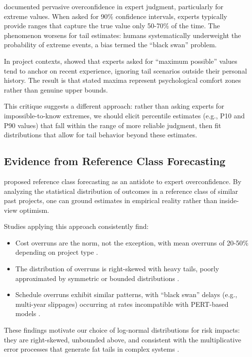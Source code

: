 \documentclass[12pt,a4paper]{article}
\theoremstyle{definition}
\theoremstyle{remark}
\begin{document}
\citet{Kahneman2011} documented pervasive overconfidence in expert judgment, particularly for extreme values. When asked for 90\% confidence intervals, experts typically provide ranges that capture the true value only 50-70\% of the time. The phenomenon worsens for tail estimates: humans systematically underweight the probability of extreme events, a bias \citet{Taleb2007} termed the ``black swan'' problem.

In project contexts, \citet{Lichtenberg2000} showed that experts asked for ``maximum possible'' values tend to anchor on recent experience, ignoring tail scenarios outside their personal history. The result is that stated maxima represent psychological comfort zones rather than genuine upper bounds.

This critique suggests a different approach: rather than asking experts for impossible-to-know extremes, we should elicit percentile estimates (e.g., P10 and P90 values) that fall within the range of more reliable judgment, then fit distributions that allow for tail behavior beyond these estimates.

\subsection{Evidence from Reference Class Forecasting}

\citet{Flyvbjerg2006} proposed reference class forecasting as an antidote to expert overconfidence. By analyzing the statistical distribution of outcomes in a reference class of similar past projects, one can ground estimates in empirical reality rather than inside-view optimism.

Studies applying this approach consistently find:
\begin{itemize}
    \item Cost overruns are the norm, not the exception, with mean overruns of 20-50\% depending on project type \citep{Flyvbjerg2002}.
    \item The distribution of overruns is right-skewed with heavy tails, poorly approximated by symmetric or bounded distributions \citep{Love2015}.
    \item Schedule overruns exhibit similar patterns, with ``black swan'' delays (e.g., multi-year slippages) occurring at rates incompatible with PERT-based models \citep{Sovacool2014}.
\end{itemize}

These findings motivate our choice of log-normal distributions for risk impacts: they are right-skewed, unbounded above, and consistent with the multiplicative error processes that generate fat tails in complex systems \citep{Limpert2001}.
\end{document}
